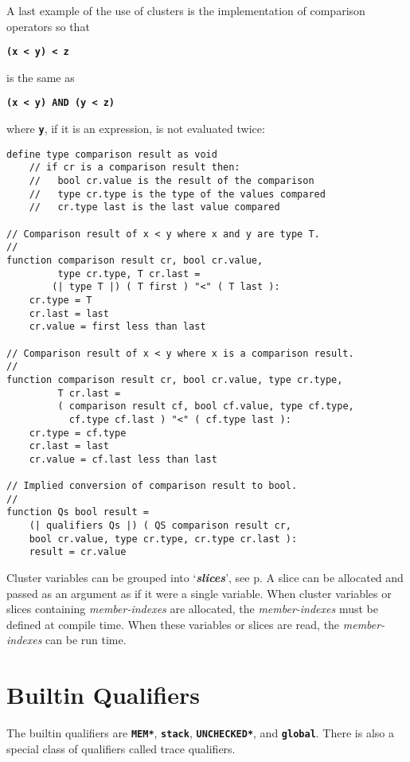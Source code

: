 \documentclass[12pt]{article}
\newcommand{\TT}[1]{{\tt \bfseries #1}}
\newcommand{\skey}[2]{{\bf \em #1#2}\index{#1}}
\newcommand{\pagref}[1]{p\pageref{#1}}
\newenvironment{indpar}[1][0.3in]%
	{\begin{list}{}%
		     {\setlength{\itemsep}{0in}%
		      \setlength{\topsep}{0in}%
		      \setlength{\parsep}{1ex}%
		      \setlength{\labelwidth}{#1}%
		      \setlength{\leftmargin}{#1}%
		      \addtolength{\leftmargin}{\labelsep}}%
	 \item}%
	{\end{list}}
\begin{document}
A last example of the use of clusters is the implementation of
comparison operators so that
\begin{center}
\TT{(x~<~y)~<~z}
\end{center}
is the same as
\begin{center}
\TT{(x~<~y) AND (y~<~z)}
\end{center}
where \TT{y}, if it is an expression,
is not evaluated twice:\label{COMPARISON-RESULTS}
\begin{indpar}\begin{verbatim}
define type comparison result as void
    // if cr is a comparison result then:
    //   bool cr.value is the result of the comparison
    //   type cr.type is the type of the values compared
    //   cr.type last is the last value compared

// Comparison result of x < y where x and y are type T.
//
function comparison result cr, bool cr.value,
         type cr.type, T cr.last =
        (| type T |) ( T first ) "<" ( T last ):
    cr.type = T
    cr.last = last
    cr.value = first less than last

// Comparison result of x < y where x is a comparison result.
//
function comparison result cr, bool cr.value, type cr.type,
         T cr.last =
         ( comparison result cf, bool cf.value, type cf.type,
           cf.type cf.last ) "<" ( cf.type last ):
    cr.type = cf.type
    cr.last = last
    cr.value = cf.last less than last

// Implied conversion of comparison result to bool.
//
function Qs bool result =
    (| qualifiers Qs |) ( QS comparison result cr,
    bool cr.value, type cr.type, cr.type cr.last ):
    result = cr.value
\end{verbatim}\end{indpar}

Cluster variables can be grouped into `\skey{slice}s', see
\pagref{SLICE}.  A slice can be allocated and passed
as an argument as if it were a single variable.  When cluster
variables or slices containing {\em member-indexes} are allocated,
the {\em member-indexes} must be defined at compile time.
When these variables or slices are read, the
{\em member-indexes} can be run time.

\section{Builtin Qualifiers}
\label{BUILTIN-QUALIFIERS}

The builtin qualifiers are \TT{*MEM*}, \TT{stack}, \TT{*UNCHECKED*},
and \TT{global}.
There is also a special class of qualifiers called trace qualifiers.
\end{document}

